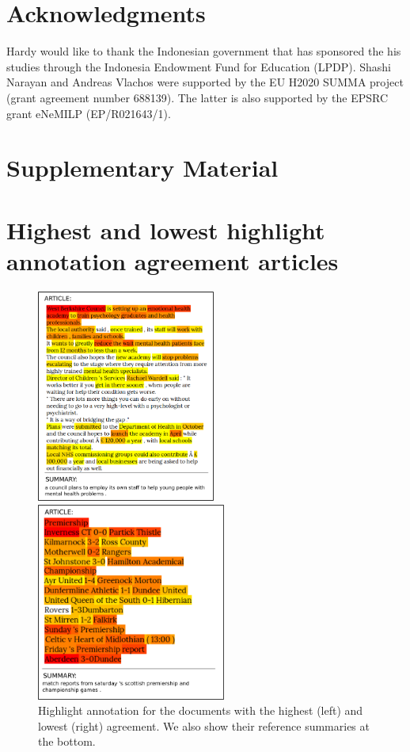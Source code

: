 \documentclass[11pt,a4paper]{article}
\begin{document}
\section*{Acknowledgments}

Hardy would like to thank the Indonesian government that
has sponsored the his studies through
the Indonesia Endowment Fund for Education
(LPDP). Shashi Narayan and Andreas Vlachos were supported by the
EU H2020 SUMMA project (grant agreement
number 688139). The latter is also supported by the EPSRC grant eNeMILP
(EP/R021643/1).




\onecolumn
\newpage
\setcounter{section}{0}
\setcounter{figure}{0}
\setcounter{table}{0}
\section*{Supplementary Material}
\section{Highest and lowest highlight annotation agreement articles}
\begin{figure}[ht!]
    \centering
    \begin{minipage}{.45\textwidth}
    \centering
    \includegraphics[height=7cm]{heatmap_best}
    \end{minipage}
    \begin{minipage}{.45\textwidth}
    \centering
    \includegraphics[height=6.5cm]{heatmap_negative}
    \end{minipage}
    \caption{Highlight annotation for the documents with the highest (left) and lowest (right) agreement. We also show their reference summaries at the bottom.}
  \label{image:heatmap_both}
\end{figure}
\newpage
\end{document}

